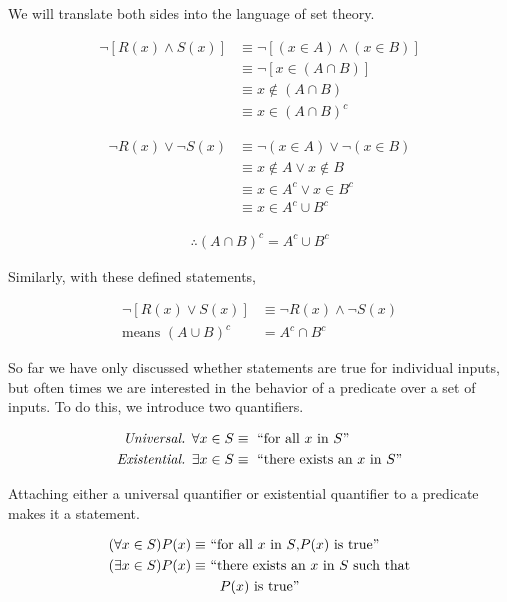 \documentclass[twoside]{report}
\begin{document}
We will translate both sides into the language of set theory.
 
\begin{align*}
	\neg[R(x) \wedge S(x)] &\equiv \neg[(x \in A) \wedge (x \in B)] \\
	&\equiv \neg[x \in (A \cap B)] \\
	&\equiv x \notin (A \cap B) \\
	&\equiv x \in (A \cap B)^c
\end{align*}

\begin{align*}
	\neg R(x) \lor \neg S(x) &\equiv \neg(x \in A) \lor \neg(x \in B) \\
	&\equiv x \notin A \lor x \notin B \\
	&\equiv x \in A^c \lor x \in B^c \\
	&\equiv x \in A^c \cup B^c
\end{align*}

\begin{align*}
	\therefore (A \cap B)^c = A^c \cup B^c
\end{align*}

Similarly, with these defined statements,

\begin{align*}
	\neg[R(x) \lor S(x)] &\equiv \neg R(x) \wedge \neg S(x) \\
	\text{means } (A \cup B)^c &= A^c \cap B^c
\end{align*}

So far we have only discussed whether statements are true for individual inputs, but often times we are interested in the behavior of a predicate over a set of inputs. To do this, we introduce two quantifiers.

\begin{align*}
	\emph{Universal. } \forall x \in S &\equiv \text{ ``for all $x$ in $S$''} \\
	\emph{Existential. } \exists x \in S &\equiv \text{ ``there exists an $x$ in $S$''}
\end{align*}

Attaching either a universal quantifier or existential quantifier to a predicate makes it a statement.

\begin{align*}
	(\forall x \in S)P(x) \equiv &\text{ ``for all $x$ in $S$,$P(x)$ is true''} \\
	(\exists x \in S)P(x) \equiv &\text{ ``there exists an $x$ in $S$ such that} \\
	& \text{\quad $P(x)$ is true''}
\end{align*}
\end{document}
